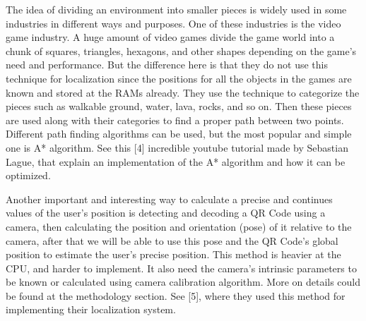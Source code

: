 \color{purple}
The idea of dividing an environment into smaller pieces is widely used in some industries in different ways and purposes. One of these industries is the video game industry. A huge amount of video games divide the game world into a chunk of squares, triangles, hexagons, and other shapes depending on the game's need and performance. But the difference here is that they do not use this technique for localization since the positions for all the objects in the games are known and stored at the RAMs already. They use the technique to categorize the pieces such as walkable ground, water, lava, rocks, and so on. Then these pieces are used along with their categories to find a proper path between two points. Different path finding algorithms can be used, but the most popular and simple one is A* algorithm. See this [4] incredible youtube tutorial made by Sebastian Lague, that explain an implementation of the A* algorithm and how it can be optimized.
\color{black}

Another important and interesting way to calculate a precise and continues values of the user's position is detecting and decoding a QR Code using a camera, then calculating the position and orientation (pose) of it relative to the camera, after that we will be able to use this pose and the QR Code's global position to estimate the user's precise position. This method is heavier at the CPU, and harder to implement. It also need the camera's intrinsic parameters to be known or calculated using camera calibration algorithm. More on details could be found at the methodology section. See [5], where they used this method for implementing their localization system.
